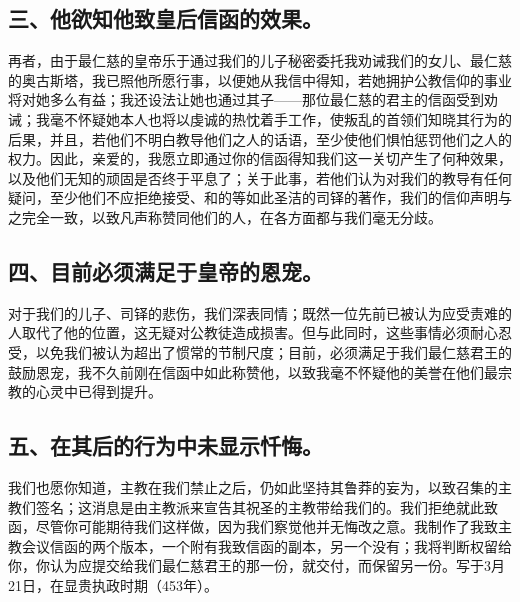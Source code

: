
\subsection{三、他欲知他致皇后信函的效果。}

再者，由于最仁慈的皇帝乐于通过我们的儿子秘密委托我劝诫我们的女儿、最仁慈的奥古斯塔，我已照他所愿行事，以便她从我信中得知，若她拥护公教信仰的事业将对她多么有益；我还设法让她也通过其子——那位最仁慈的君主的信函受到劝诫；我毫不怀疑她本人也将以虔诚的热忱着手工作，使叛乱的首领们知晓其行为的后果，并且，若他们不明白教导他们之人的话语，至少使他们惧怕惩罚他们之人的权力。因此，亲爱的，我愿立即通过你的信函得知我们这一关切产生了何种效果，以及他们无知的顽固是否终于平息了；关于此事，若他们认为对我们的教导有任何疑问，至少他们不应拒绝接受、和的等如此圣洁的司铎的著作，我们的信仰声明与之完全一致，以致凡声称赞同他们的人，在各方面都与我们毫无分歧。\par


\subsection{四、目前必须满足于皇帝的恩宠。}

对于我们的儿子、司铎的悲伤，我们深表同情；既然一位先前已被认为应受责难的人取代了他的位置，这无疑对公教徒造成损害。但与此同时，这些事情必须耐心忍受，以免我们被认为超出了惯常的节制尺度；目前，必须满足于我们最仁慈君王的鼓励恩宠，我不久前刚在信函中如此称赞他，以致我毫不怀疑他的美誉在他们最宗教的心灵中已得到提升。\par


\subsection{五、在其后的行为中未显示忏悔。}

我们也愿你知道，主教在我们禁止之后，仍如此坚持其鲁莽的妄为，以致召集的主教们签名；这消息是由主教派来宣告其祝圣的主教带给我们的。我们拒绝就此致函，尽管你可能期待我们这样做，因为我们察觉他并无悔改之意。我制作了我致主教会议信函的两个版本，一个附有我致信函的副本，另一个没有；我将判断权留给你，你认为应提交给我们最仁慈君王的那一份，就交付，而保留另一份。写于3月21日，在显贵执政时期（453年）。\par

